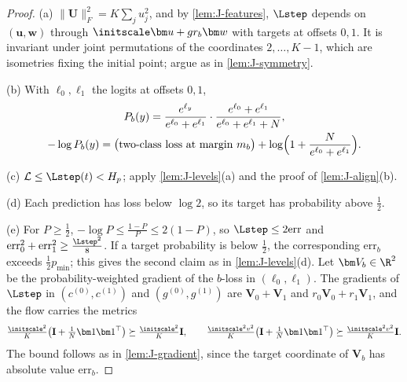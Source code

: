 \begin{proof}
(a) $\|\mathbf U\|_F^2=K\sum_ju_j^2$, and by \cref{lem:J-features}, $\Lstep$ depends on $(\bm u,\bm w)$ through $\initscale\bm u+gr_b\bm w$ with targets at offsets $0,1$.
It is invariant under joint permutations of the coordinates $2,\ldots,K-1$, which are isometries fixing the initial point; argue as in
\cref{lem:J-symmetry}.

(b) With $\ell_0,\ell_1$ the logits at offsets $0,1$,
\begin{gather*}
 P_b(y)=\frac{e^{\ell_y}}{e^{\ell_0}+e^{\ell_1}}\cdot\frac{e^{\ell_0}+e^{\ell_1}}{e^{\ell_0}+e^{\ell_1}+N},\\
 -\log P_b(y)=\bigl(\text{two-class loss at margin }m_b\bigr)+\log\Bigl(1+\frac{N}{e^{\ell_0}+e^{\ell_1}}\Bigr).
\end{gather*}

(c) $\mathcal L\le\Lstep(t)<H_p$; apply \cref{lem:J-levels}(a) and the proof of \cref{lem:J-align}(b).

(d) Each prediction has loss below $\log2$, so its target has probability above $\frac{1}{2}$.

(e) For $P\ge\frac{1}{2}$, $-\log P\le\frac{1-P}{P}\le2(1-P)$, so $\Lstep\le2\mathrm{err}$ and $\mathrm{err}_0^2+\mathrm{err}_1^2\ge\frac{\Lstep^2}{8}$. If a target probability is below $\frac{1}{2}$, the
corresponding $\mathrm{err}_b$ exceeds $\frac{1}{2}p_{\min}$; this gives the second claim as in \cref{lem:J-levels}(d). Let $\bm V_b\in\R^2$ be the probability-weighted
gradient of the $b$-loss in $(\ell_0,\ell_1)$. The gradients of $\Lstep$ in $(c^{(0)},c^{(1)})$ and $(g^{(0)},g^{(1)})$ are $\bm V_0+\bm V_1$ and $r_0\bm V_0+r_1\bm V_1$, and
the flow carries the metrics
\[
 \tfrac{\initscale^2}{K}\bigl(\mathbf I+\tfrac{1}{N}\bm1\bm1^\top\bigr)\succeq\tfrac{\initscale^2}{K}\mathbf I,\qquad \tfrac{\initscale^2v^2}{K}\bigl(\mathbf I+\tfrac{1}{N}\bm1\bm1^\top\bigr)\succeq\tfrac{\initscale^2v^2}{K}\mathbf I .
\]
The bound follows as in \cref{lem:J-gradient}, since the target coordinate of $\bm V_b$ has absolute value $\mathrm{err}_b$.
\end{proof}

